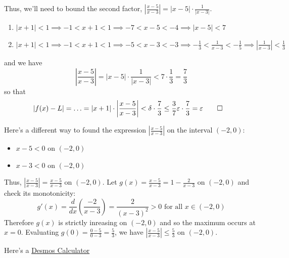 \documentclass{article}
\begin{document}
\begin{enumerate}
  Thus, we'll need to bound the second factor, $\left| \frac{x-5}{x-3} \right| = \left|x-5\right|\cdot \frac{1}{\left|x-3\right|}$. 

  \begin{enumerate}
    \item $\left|x+1\right| < 1 \implies -1 < x + 1 < 1 \implies -7 < x-5 < -4 \implies \left|x-5\right| < 7$
    \item $\left|x+1\right| < 1 \implies -1 < x + 1 < 1 \implies -5 < x-3 < -3 \implies -\frac{1}{3} < \frac{1}{x-3} < -\frac{1}{5} \implies \left|\frac{1}{x-3}\right| < \frac{1}{3}$
  \end{enumerate}

  and we have
  \begin{equation*}
    \left| \frac{x-5}{x-3} \right| = \left|x-5\right|\cdot \frac{1}{\left|x-3\right|} < 7 \cdot \frac{1}{3} = \frac{7}{3}
  \end{equation*}
  so that   
  \begin{align*}
    \left| f(x) - L \right| &= \ldots = \left|x+1\right| \cdot \left| \frac{x-5}{x-3} \right| < \delta \cdot \frac{7}{3} \leq \frac{3}{7}\epsilon \cdot \frac{7}{3} = \epsilon \qed
  \end{align*}

  Here's a different way to found the expression $\left|\frac{x-5}{x-3}\right|$ on the interval $\left(-2,0\right)$:
  \begin{itemize}
  \item $x-5 < 0$ on $\left(-2,0\right)$ \\
  \item $x-3 < 0$ on $\left(-2,0\right)$ \\
  \end{itemize}
  Thus, $\left|\frac{x-5}{x-3}\right| = \frac{x-5}{x-3}$ on $\left(-2,0\right)$. Let $g(x) = \frac{x-5}{x-3} = 1 - \frac{2}{x-3}$ on $\left(-2,0\right)$ and check its monotonicity:
  \begin{equation*}
    g'(x) = \frac{d}{dx}\left(\frac{-2}{x-3}\right) = \frac{2}{(x-3)^2} > 0 \text{ for all }x \in \left(-2,0\right)
  \end{equation*}
  Therefore $g(x)$ is strictly inreasing on $\left(-2,0\right)$ and so the maximum occurs at $x=0$. Evaluating $g(0) = \frac{0-5}{0-3} = \frac{5}{3}$, we have $\left|\frac{x-5}{x-3}\right| \leq \frac{5}{3}$ on $\left(-2,0\right)$.
\end{enumerate}
Here's a \href{https://www.desmos.com/calculator/aizorrivt8}{Desmos Calculator}
\end{document}
